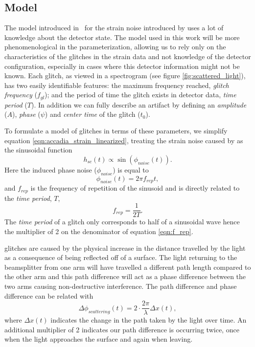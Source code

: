 \subsection{Model}

The model introduced in~\cite{TAccadia} for the \gw{} strain noise introduced by \scl{} uses a lot of knowledge about the detector state. The model used in this work will be more phenomenological in the parameterization, allowing us to rely only on the characteristics of the glitches in the strain data and not knowledge of the detector configuration, especially in cases where this detector information might not be known. Each \scl{} glitch, as viewed in a spectrogram (see figure \ref{fig:scattered_light}), has two easily identifiable features: the maximum frequency reached, \emph{glitch frequency} ($f_{gl}$); and the period of time the glitch exists in detector data, \emph{time period} ($T$).  In addition we can fully describe an artifact by defining an \emph{amplitude} ($A$), \emph{phase} ($\psi$) and \emph{center time} of the glitch ($t_0$).

To formulate a model of \scl{} glitches in terms of these parameters, we simplify equation \ref{eqn:accadia_strain_linearized}, treating the strain noise caused by \scl{} as the sinusoidal function
%
\begin{equation}
  h_{sc}(t) \propto \sin(\phi_{noise}(t)).
  \label{eqn:h_sc_initial}
\end{equation}
%
Here the induced phase noise ($\phi_{noise}$) is equal to 
%
\begin{equation}
    \phi_{noise}(t) = 2 \pi f_{rep} t,
     \label{eqn:phi_noise}
\end{equation}
%
and $f_{rep}$ is the frequency of repetition of the sinusoid and is directly related to the \emph{time period}, $T$,
%
\begin{equation}
  f_{rep} = \frac{1}{2 T}.
  \label{eqn:f_rep}
\end{equation}
%
The \emph{time period} of a \scl{} glitch only corresponds to half of a sinusoidal wave hence the multiplier of 2 on the denominator of equation \ref{eqn:f_rep}.

\Scl{} glitches are caused by the physical increase in the distance travelled by the light as a consequence of being reflected off of a surface. The light returning to the beamsplitter from one arm will have travelled a different path length compared to the other arm and this path difference will act as a phase difference between the two arms causing non-destructive interference. The path difference and phase difference can be related with
%
\begin{equation}
  \Delta \phi_{scattering}(t) = 2 \cdot \frac{2 \pi}{\lambda} \Delta x(t),
  \label{eqn:delta_phi_scat}
\end{equation}
%
where $\Delta x(t)$ indicates the change in the path taken by the light over time. An additional multiplier of 2 indicates our path difference is occurring twice, once when the light approaches the surface and again when leaving.

